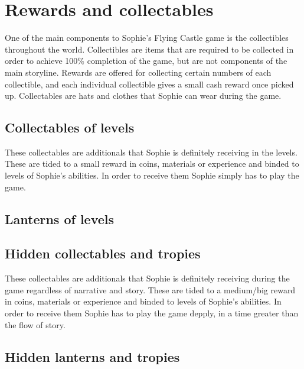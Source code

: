 \section{Rewards and collectables}
One of the main components to Sophie's Flying Castle game is the collectibles throughout the world.
Collectibles are items that are required to be collected in order to achieve 100\%
completion of the game, but are not components of the main storyline. Rewards are offered for collecting certain numbers of each
collectible, and each individual collectible gives a small cash reward once picked up. Collectables are hats and clothes that Sophie
can wear during the game. 

\subsection{Collectables of levels}
These collectables are additionals that Sophie is definitely receiving in the levels. These are tided to a small reward in coins, materials or experience and binded to levels of Sophie's abilities. In order to receive them Sophie simply has to play the game. 

\subsection{Lanterns of levels}

\subsection{Hidden collectables and tropies}
These collectables are additionals that Sophie is definitely receiving during the game regardless of narrative and story. These are tided to a medium/big reward in coins, materials or experience and binded to levels of Sophie's abilities. In order to receive them Sophie has to play the game depply, in a time greater than the flow of story. 

\subsection{Hidden lanterns and tropies}

